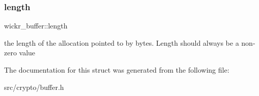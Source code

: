 \subsubsection{\texorpdfstring{length}{length}}
{\footnotesize\ttfamily wickr\+\_\+buffer\+::length}

the length of the allocation pointed to by bytes. Length should always be a non-\/zero value 

The documentation for this struct was generated from the following file\+:\begin{DoxyCompactItemize}
\item 
src/crypto/buffer.\+h\end{DoxyCompactItemize}
